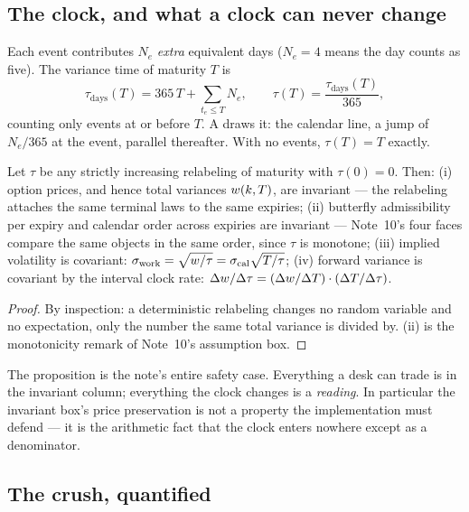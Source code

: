 \documentclass[11pt]{article}
\begin{document}
\subsection{The clock, and what a clock can never change}

Each event contributes $N_e$ \emph{extra} equivalent days ($N_e=4$
means the day counts as five).  The variance time of maturity $T$ is
\begin{equation}
\boxed{\;\tau_{\mathrm{days}}(T)=365\,T+\!\!\sum_{t_e\le T}\!N_e,
\qquad \tau(T)=\frac{\tau_{\mathrm{days}}(T)}{365},\;}
\label{eq:clock}
\end{equation}
counting only events at or before $T$.  A draws it: the
calendar line, a jump of $N_e/365$ at the event, parallel thereafter.
With no events, $\tau(T)=T$ exactly.

\begin{proposition}
\label{prop:gauge}
Let $\tau$ be any strictly increasing relabeling of maturity with
$\tau(0)=0$.  Then: (i) option prices, and hence total variances
$w(k,T)$, are invariant --- the relabeling attaches the same
terminal laws to the same expiries; (ii) butterfly admissibility per
expiry and calendar order across expiries are invariant --- Note~10's
four faces compare the same objects in the same order, since $\tau$ is
monotone; (iii) implied volatility is covariant:
$\sigma_{\mathrm{work}}=\sqrt{w/\tau}
=\sigma_{\mathrm{cal}}\sqrt{T/\tau}$; (iv) forward variance is
covariant by the interval clock rate:
$\Delta w/\Delta\tau=(\Delta w/\Delta T)\cdot
(\Delta T/\Delta\tau)$.
\end{proposition}

\begin{proof}
By inspection: a deterministic relabeling changes no random variable
and no expectation, only the number the same total variance is divided
by.  (ii) is the monotonicity remark of Note~10's assumption box.
\end{proof}

The proposition is the note's entire safety case.  Everything a desk
can trade is in the invariant column; everything the clock changes is a
\emph{reading}.  In particular the invariant box's price preservation
is not a property the implementation must defend --- it is the
arithmetic fact that the clock enters nowhere except as a denominator.

\subsection{The crush, quantified}
\end{document}
